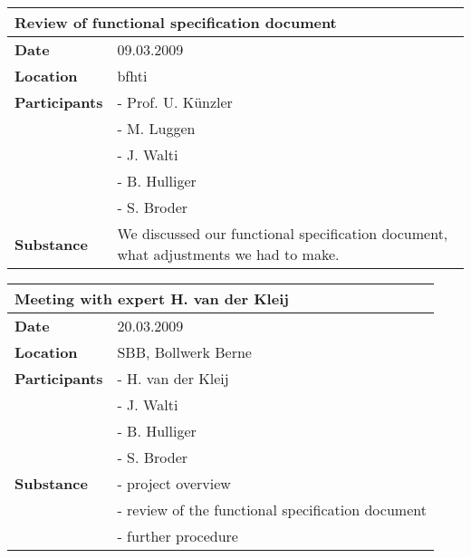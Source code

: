 \begin{table}[H]
	\centering
	\begin{tabular}{|b{}|b{}|}
		\hline
 		\multicolumn{2}{|l|}{\bfseries Review of functional specification document} \\
		\hline\hline
		\bfseries Date & 09.03.2009 \\
		\hline
		\bfseries Location & \gls{bfhti} \\
		\hline
		\bfseries Participants & - Prof. U. K\"unzler \\
		&- M. Luggen\\
		&- J. Walti\\
		&- B. Hulliger\\
		&- S. Broder \\
		\hline
		\bfseries Substance & We discussed our functional specification document, what adjustments we had to make.\\
		\hline
	\end{tabular}
\end{table}

\begin{table}[H]
	\centering
	\begin{tabular}{|b{}|b{}|}
		\hline
 		\multicolumn{2}{|l|}{\bfseries Meeting with expert H. van der Kleij} \\
		\hline\hline
		\bfseries Date & 20.03.2009 \\
		\hline
		\bfseries Location & SBB, Bollwerk Berne \\
		\hline
		\bfseries Participants & - H. van der Kleij \\
		&- J. Walti\\
		&- B. Hulliger\\
		&- S. Broder \\
		\hline
		\bfseries Substance & - project overview \\
		&- review of the functional specification document \\
		&- further procedure\\
		\hline
	\end{tabular}
\end{table}

